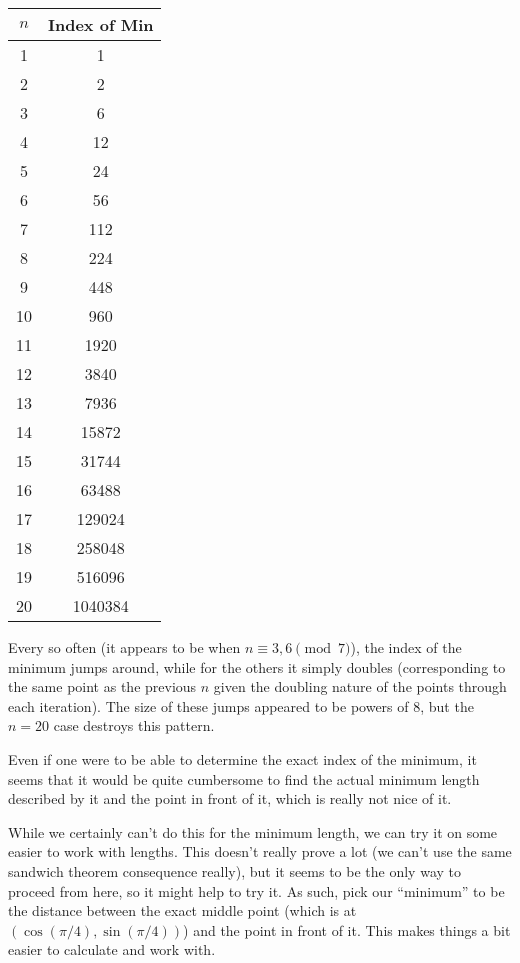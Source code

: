 \documentclass{article}
\begin{document}
\begin{center}
\begin{tabular}{c|c}
    \( n \) & Index of Min \\
    \hline
    1 & 1 \\
    2 & 2 \\
    3 & 6 \\
    4 & 12 \\
    5 & 24 \\
    6 & 56 \\
    7 & 112 \\
    8 & 224 \\
    9 & 448 \\
    10 & 960 \\
    11 & 1920 \\
    12 & 3840 \\
    13 & 7936 \\
    14 & 15872 \\
    15 & 31744 \\
    16 & 63488 \\
    17 & 129024 \\
    18 & 258048 \\
    19 & 516096 \\
    20 & 1040384 \\
\end{tabular}
\end{center}

Every so often (it appears to be when \( n \equiv 3, 6 \pmod{7} \)), the index
of the minimum jumps around, while for the others it simply doubles
(corresponding to the same point as the previous \( n \) given the doubling
nature of the points through each iteration). The size of these jumps appeared
to be powers of \( 8 \), but the \( n = 20 \) case destroys this pattern.

Even if one were to be able to determine the exact index of the minimum, it
seems that it would be quite cumbersome to find the actual minimum length
described by it and the point in front of it, which is really not nice of it.

While we certainly can't do this for the minimum length, we can try it on some
easier to work with lengths. This doesn't really prove a lot (we can't use the
same sandwich theorem consequence really), but it seems to be the only way to
proceed from here, so it might help to try it. As such, pick our ``minimum'' to
be the distance between the exact middle point (which is at \( \left(
\cos{\left( \pi/4 \right)}, \sin{\left( \pi/4 \right)} \right) \)) and the
point in front of it. This makes things a bit easier to calculate and work
with.
\end{document}
